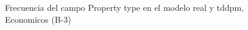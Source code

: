 \begin{figure}[H]
    \centering
    
    \caption{Frecuencia del campo Property type en el modelo real y tddpm, Economicos (B-3)}
    \label{frecuency-Property Type-tddpm_mlp}
\end{figure}